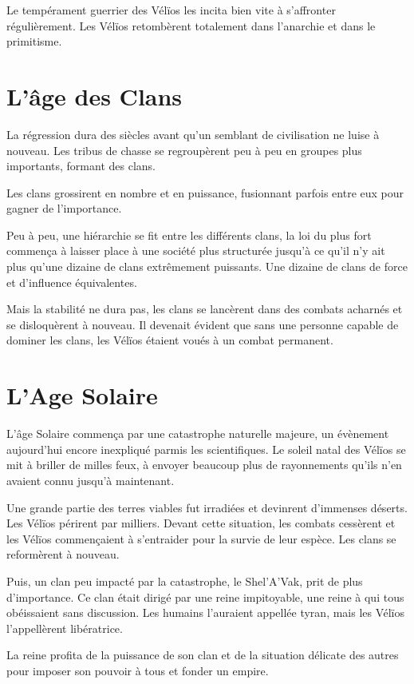 \begin{multicols*}{2}
Le tempérament guerrier des Vélïos les incita bien vite à s’affronter régulièrement. Les Vélïos retombèrent totalement dans l’anarchie et dans le primitisme. 

\section{L’âge des Clans}

La régression dura des siècles avant qu’un semblant de civilisation ne luise à nouveau. Les tribus de chasse se regroupèrent peu à peu en groupes plus importants, formant des clans.

Les clans grossirent en nombre et en puissance, fusionnant parfois entre eux pour gagner de l’importance.

Peu à peu, une hiérarchie se fit entre les différents clans, la loi du plus fort commença à laisser place à une société plus structurée jusqu’à ce qu’il n’y ait plus qu’une dizaine de clans extrêmement puissants. Une dizaine de clans de force et d’influence équivalentes.

Mais la stabilité ne dura pas, les clans se lancèrent dans des combats acharnés et se disloquèrent à nouveau. Il devenait évident que sans une personne capable de dominer les clans, les Vélïos étaient voués à un combat permanent.

\section{L’Age Solaire}

L’âge Solaire commença par une catastrophe naturelle majeure, un évènement aujourd’hui encore inexpliqué parmis les scientifiques. Le soleil natal des Vélïos se mit à briller de milles feux, à envoyer beaucoup plus de rayonnements qu’ils n’en avaient connu jusqu’à maintenant.

Une grande partie des terres viables fut irradiées et devinrent d’immenses déserts. Les Vélïos périrent par milliers. Devant cette situation, les combats cessèrent et les Vélïos commençaient à s’entraider pour la survie de leur espèce. Les clans se reformèrent à nouveau.

Puis, un clan peu impacté par la catastrophe, le Shel’A’Vak, prit de plus d’importance. Ce clan était dirigé par une reine impitoyable, une reine à qui tous obéissaient sans discussion. Les humains l’auraient appellée tyran, mais les Vélïos l’appellèrent libératrice.

La reine profita de la puissance de son clan et de la situation délicate des autres pour imposer son pouvoir à tous et fonder un empire.


\end{multicols*}
